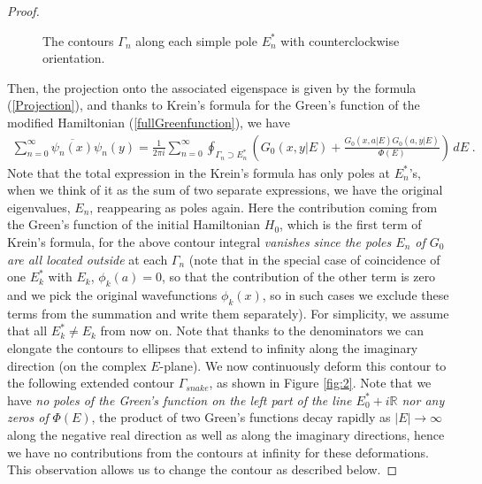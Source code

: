 \documentclass[amsmath,amssymb,14pt]{article}
\numberwithin{equation}{section}
\begin{document}
\begin{proof}
\begin{figure}[h!]
\begin{center}
\end{center}
\caption{The contours $\Gamma_n$ along each simple pole $E_{n}^{*}$ with counterclockwise orientation.}
    \label{fig:1}
\end{figure}





%
Then, the projection onto the associated eigenspace is given by the formula (\ref{Projection}), and thanks to Krein's formula for the Green's function of the modified Hamiltonian (\ref{fullGreenfunction}), we have
%
\begin{eqnarray}
   \sum_{n=0}^{\infty} \overline{\psi_n(x)} \psi_n (y) =   \frac{1}{2\pi i} \sum_{n=0}^{\infty} \oint_{\Gamma_n \supset E_{n}^*} \left(G_0(x,y|E)+\frac{G_0(x,a|E) G_0(a,y|E)}{\Phi(E)}  \right) \, dE \;.
\end{eqnarray}
%
Note that the total expression in the Krein's formula has only poles at $E_n^*$'s, when we think of it as the sum of two separate expressions, we have the original eigenvalues, $E_n$, reappearing as poles again. 
Here the contribution coming from the Green's function of the initial Hamiltonian $H_0$, which is the first term of Krein's formula,  for the above contour integral  {\it vanishes since the poles $E_n$ of $G_0$ are all located outside} at each $\Gamma_n$ (note that in the special case of coincidence of one $E_k^*$ with $E_k$, $\phi_k(a)=0$, so that the contribution of the other term is zero and we pick the original wavefunctions $\phi_k(x)$, so in such cases we exclude these terms from the summation and write them separately). For simplicity, we assume that all $E_k^*\neq E_k$ from now on.
Note that thanks to the denominators we can elongate the contours to ellipses that extend to infinity along the imaginary direction (on the complex $E$-plane). We now continuously deform this contour to the following extended contour $\Gamma_{snake}$, as shown in Figure \ref{fig:2}. Note that we have {\it no poles of the Green's function on the left part of the line $E_{0}^{*} + i {\mathbb R}$ nor any zeros of} $\Phi(E)$, the product of two Green's functions decay rapidly as $|E|\to \infty$ along the negative real direction as well as along the imaginary directions, hence we have no contributions from the contours at infinity for these deformations. This observation allows us to change the contour as described below.


\end{proof}
\end{document}
